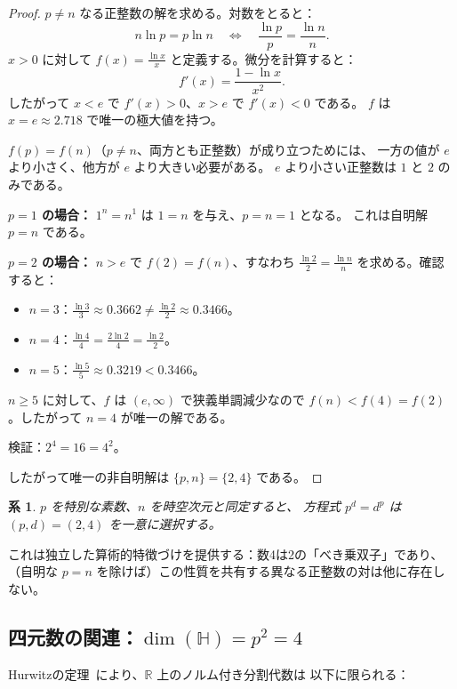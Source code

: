 \documentclass[12pt,a4paper]{article}
\newtheorem{corollary}[theorem]{系}
\theoremstyle{definition}
\newcommand{\RR}{\mathbb{R}}
\newcommand{\HH}{\mathbb{H}}
\begin{document}
\begin{proof}
$p \neq n$ なる正整数の解を求める。対数をとると：
\[
  n \ln p = p \ln n \quad \Longleftrightarrow \quad \frac{\ln p}{p} = \frac{\ln n}{n}.
\]
$x > 0$ に対して $f(x) = \frac{\ln x}{x}$ と定義する。微分を計算すると：
\[
  f'(x) = \frac{1 - \ln x}{x^2}.
\]
したがって $x < e$ で $f'(x) > 0$、$x > e$ で $f'(x) < 0$ である。
$f$ は $x = e \approx 2.718$ で唯一の極大値を持つ。

$f(p) = f(n)$（$p \neq n$、両方とも正整数）が成り立つためには、
一方の値が $e$ より小さく、他方が $e$ より大きい必要がある。
$e$ より小さい正整数は $1$ と $2$ のみである。

\textbf{$p = 1$ の場合：} $1^n = n^1$ は $1 = n$ を与え、$p = n = 1$ となる。
これは自明解 $p = n$ である。

\textbf{$p = 2$ の場合：} $n > e$ で $f(2) = f(n)$、すなわち
$\frac{\ln 2}{2} = \frac{\ln n}{n}$ を求める。確認すると：
\begin{itemize}
  \item $n = 3$：$\frac{\ln 3}{3} \approx 0.3662 \neq \frac{\ln 2}{2} \approx 0.3466$。
  \item $n = 4$：$\frac{\ln 4}{4} = \frac{2\ln 2}{4} = \frac{\ln 2}{2}$。\checkmark
  \item $n = 5$：$\frac{\ln 5}{5} \approx 0.3219 < 0.3466$。
\end{itemize}
$n \geq 5$ に対して、$f$ は $(e, \infty)$ で狭義単調減少なので
$f(n) < f(4) = f(2)$。したがって $n = 4$ が唯一の解である。

検証：$2^4 = 16 = 4^2$。\checkmark

したがって唯一の非自明解は $\{p, n\} = \{2, 4\}$ である。
\end{proof}

\begin{corollary}\label{cor:d_from_pn}
$p$ を特別な素数、$n$ を時空次元と同定すると、
方程式 $p^d = d^p$ は $(p, d) = (2, 4)$ を一意に選択する。
\end{corollary}

これは独立した算術的特徴づけを提供する：数4は2の「べき乗双子」であり、
（自明な $p = n$ を除けば）この性質を共有する異なる正整数の対は他に存在しない。

\subsection{四元数の関連：$\dim(\HH) = p^2 = 4$}

Hurwitzの定理~\cite{Hurwitz1898}により、$\RR$ 上のノルム付き分割代数は
以下に限られる：
\end{document}
